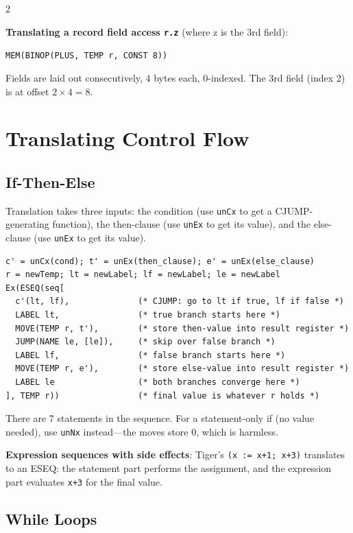 \documentclass[9pt,landscape]{extarticle}
\begin{document}
\begin{multicols}{2}
\begin{exambox}
\textbf{Translating a record field access \texttt{r.z}} (where z is the 3rd field):

\texttt{MEM(BINOP(PLUS, TEMP r, CONST 8))}

Fields are laid out consecutively, 4 bytes each, 0-indexed. The 3rd field (index 2) is at offset $2 \times 4 = 8$.
\end{exambox}

\section{Translating Control Flow}

\subsection{If-Then-Else}

Translation takes three inputs: the condition (use \texttt{unCx} to get a CJUMP-generating function), the then-clause (use \texttt{unEx} to get its value), and the else-clause (use \texttt{unEx} to get its value).

\begin{lstlisting}
c' = unCx(cond); t' = unEx(then_clause); e' = unEx(else_clause)
r = newTemp; lt = newLabel; lf = newLabel; le = newLabel
Ex(ESEQ(seq[
  c'(lt, lf),              (* CJUMP: go to lt if true, lf if false *)
  LABEL lt,                (* true branch starts here *)
  MOVE(TEMP r, t'),        (* store then-value into result register *)
  JUMP(NAME le, [le]),     (* skip over false branch *)
  LABEL lf,                (* false branch starts here *)
  MOVE(TEMP r, e'),        (* store else-value into result register *)
  LABEL le                 (* both branches converge here *)
], TEMP r))                (* final value is whatever r holds *)
\end{lstlisting}

There are 7 statements in the sequence. For a statement-only if (no value needed), use \texttt{unNx} instead---the moves store 0, which is harmless.

\textbf{Expression sequences with side effects}: Tiger's \texttt{(x := x+1; x+3)} translates to an ESEQ: the statement part performs the assignment, and the expression part evaluates \texttt{x+3} for the final value.

\subsection{While Loops}


\end{multicols}
\end{document}
